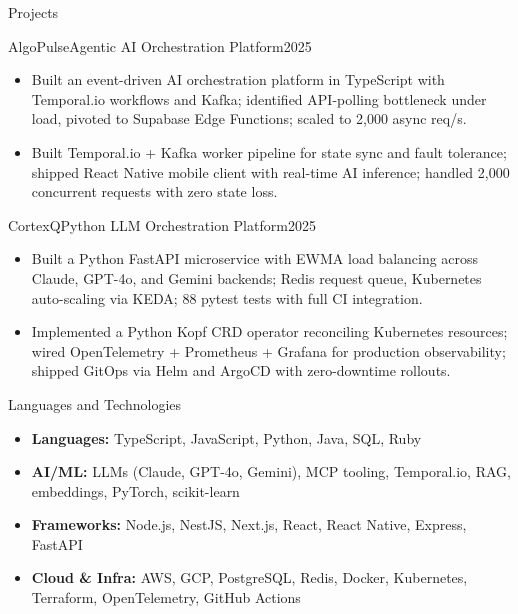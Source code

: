 \documentclass[]{mcdowellcv}
\begin{document}
\begin{cvsection}{Projects}
  \begin{cvsubsection}{AlgoPulse}{Agentic AI Orchestration Platform}{2025}
    \begin{itemize}
      \item Built an event-driven AI orchestration platform in TypeScript with Temporal.io workflows and Kafka; identified API-polling bottleneck under load, pivoted to Supabase Edge Functions; scaled to 2,000 async req/s.
      \item Built Temporal.io + Kafka worker pipeline for state sync and fault tolerance; shipped React Native mobile client with real-time AI inference; handled 2,000 concurrent requests with zero state loss.
    \end{itemize}
    \vspace{-1.5pt}
  \end{cvsubsection}

  \begin{cvsubsection}{CortexQ}{Python LLM Orchestration Platform}{2025}
    \begin{itemize}
      \item Built a Python FastAPI microservice with EWMA load balancing across Claude, GPT-4o, and Gemini backends; Redis request queue, Kubernetes auto-scaling via KEDA; 88 pytest tests with full CI integration.
      \item Implemented a Python Kopf CRD operator reconciling Kubernetes resources; wired OpenTelemetry + Prometheus + Grafana for production observability; shipped GitOps via Helm and ArgoCD with zero-downtime rollouts.
    \end{itemize}
    \vspace{-1.5pt}
  \end{cvsubsection}
\end{cvsection}

\begin{cvsection}{Languages and Technologies}
  \begin{cvsubsection}{}{}{}
    \begin{itemize}
      \item \textbf{Languages:} TypeScript, JavaScript, Python, Java, SQL, Ruby
      \item \textbf{AI/ML:} LLMs (Claude, GPT-4o, Gemini), MCP tooling, Temporal.io, RAG, embeddings, PyTorch, scikit-learn
      \item \textbf{Frameworks:} Node.js, NestJS, Next.js, React, React Native, Express, FastAPI
      \item \textbf{Cloud \& Infra:} AWS, GCP, PostgreSQL, Redis, Docker, Kubernetes, Terraform, OpenTelemetry, GitHub Actions
    \end{itemize}
  \end{cvsubsection}
\end{cvsection}
\end{document}
